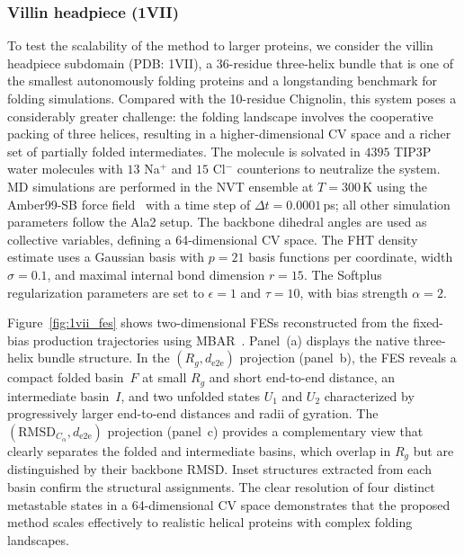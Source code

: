 \documentclass[a4paper,fleqn]{cas-sc}
\theoremstyle{definition}
\begin{document}
\subsubsection{Villin headpiece (1VII)}
\label{subsubsec:1vii}

To test the scalability of the method to larger proteins, we consider the villin headpiece subdomain (PDB: 1VII), a 36-residue three-helix bundle that is one of the smallest autonomously folding proteins and a longstanding benchmark for folding simulations.
Compared with the 10-residue Chignolin, this system poses a considerably greater challenge: the folding landscape involves the cooperative packing of three helices, resulting in a higher-dimensional CV space and a richer set of partially folded intermediates.
The molecule is solvated in $4395$ TIP3P water molecules with $13$ Na$^+$ and $15$ Cl$^-$ counterions to neutralize the system.
MD simulations are performed in the NVT ensemble at $T = 300$\,K using the Amber99-SB force field~\cite{hornak2006comparison} with a time step of $\Delta t = 0.0001$\,ps; all other simulation parameters follow the Ala2 setup.
The backbone dihedral angles are used as collective variables, defining a 64-dimensional CV space.
The FHT density estimate uses a Gaussian basis with $p = 21$ basis functions per coordinate, width $\sigma = 0.1$, and maximal internal bond dimension $r = 15$.
The Softplus regularization parameters are set to $\epsilon = 1$ and $\tau = 10$, with bias strength $\alpha = 2$.

Figure~\ref{fig:1vii_fes} shows two-dimensional FESs reconstructed from the fixed-bias production trajectories using MBAR~\cite{shirts2008statistically}.
Panel~(a) displays the native three-helix bundle structure.
In the $(R_g, d_{\mathrm{e2e}})$ projection (panel~b), the FES reveals a compact folded basin~$F$ at small $R_g$ and short end-to-end distance, an intermediate basin~$I$, and two unfolded states $U_1$ and $U_2$ characterized by progressively larger end-to-end distances and radii of gyration.
The $(\mathrm{RMSD}_{C_\alpha}, d_{\mathrm{e2e}})$ projection (panel~c) provides a complementary view that clearly separates the folded and intermediate basins, which overlap in $R_g$ but are distinguished by their backbone RMSD.
Inset structures extracted from each basin confirm the structural assignments.
The clear resolution of four distinct metastable states in a 64-dimensional CV space demonstrates that the proposed method scales effectively to realistic helical proteins with complex folding landscapes.
\end{document}
